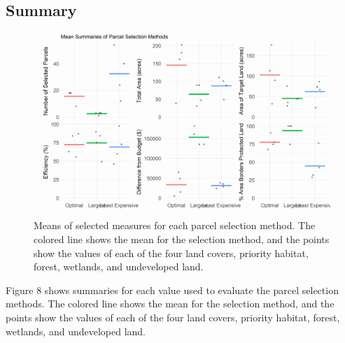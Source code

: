 \documentclass[12pt, stu, floatsintext,table]{apa7}
\begin{document}
\begin{table}[hbtp]
\caption{Summary of selected undeveloped parcels.} 
\end{table}

\subsection{Summary}
\begin{figure}[hbtp]
    \centering
    \includegraphics[width = \textwidth]{figures/summary.png}
    \caption{Means of selected measures for each parcel selection method. The colored line shows the mean for the selection method, and the points show the values of each of the four land covers, priority habitat, forest, wetlands, and undeveloped land. }
\end{figure}
Figure 8 shows summaries for each value used to evaluate the parcel selection methods. The colored line shows the mean for the selection method, and the points show the values of each of the four land covers, priority habitat, forest, wetlands, and undeveloped land.  
\end{document}
